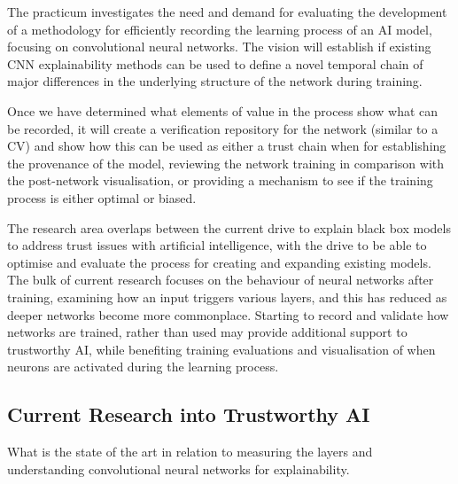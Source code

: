 The practicum investigates the need and demand for evaluating the development of a methodology for efficiently recording the learning process of an AI model, focusing on convolutional neural networks. The vision will establish if existing CNN explainability methods can be used to define a novel temporal chain of major differences in the underlying structure of the network during training.
 
Once we have determined what elements of value in the process show what can be recorded, it will create a verification repository for the network (similar to a CV) and show how this can be used as either a trust chain when for establishing the provenance of the model, reviewing the network training in comparison with the post-network visualisation, or providing a mechanism to see if the training process is either optimal or biased.

The research area overlaps between the current drive to explain black box models to address trust issues with artificial intelligence, with the drive to be able to optimise and evaluate the process for creating and expanding existing models. The bulk of current research focuses on the behaviour of neural networks after training, examining how an input triggers various layers, and this has reduced as deeper networks become more commonplace. Starting to record and validate how networks are trained, rather than used may provide additional support to trustworthy AI, while benefiting training evaluations and visualisation of when neurons are activated during the learning process.


\subsection{Current Research into Trustworthy AI}
What is the state of the art in relation to measuring the layers and understanding convolutional neural networks for explainability.

